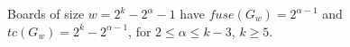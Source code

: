 \documentclass[12pt,letterpaper]{article}
\begin{document}
\begin{comment}
\begin{prop}
  Boards of size $w=2^n-5$ have $tc(G_w)=2^n-2$ and $fuse(G_w)=2$.
\end{prop}
\begin{proof} %
  Consider the board after $2^{n-2}$ steps, by~\cref{Power2} we have that $G_w(2^{n-2})=2^{n-2}-3\cdot 0\oplus 1\oplus 2^{n-1}-1\cdot 0 \oplus 1\oplus 2^{n-2}-3\cdot 0$. By the same proposition and~\cref{lightspeed}, it will advance through the next $2^{n-2}-3$ steps without interacting with the edges. By the same logic as used in the proof of~\cref{Power2}, we conclude that $G_w(2^{n-1}-4) = 0\oplus 1\oplus 7\cdot 0\oplus 1\oplus 7 \cdot 0\oplus\cdots\oplus 1\oplus 7\cdot 0\oplus 1\oplus 0$, with enough repetitions to fill the board, that is, $((2^n-5)-3)/8 = (2^n-8)/8=2^{n-3}-1$ repetitions. Then in two steps we get $000\oplus 1\oplus 000\oplus 1\oplus\cdots\oplus 000\oplus 1\oplus 000$, with $2^{n-2}-2$ 1s. And finally in two more steps this becomes $01\oplus 2^n-9\cdot 0 \oplus 10=G_w(2^{n-1})$. By~\cref{SymmetricAntipodeAll} we get the desired result. 
\end{proof}
\end{comment}
\begin{prop}\label{Pow2MinusPow2}
  Boards of size $w=2^k-2^\alpha-1$ have $fuse(G_w)=2^{\alpha-1}$ and $tc(G_w)=2^k-2^{\alpha-1}$, for $2 \leq \alpha \leq k-3$, $k\geq 5$. 
\end{prop}
\end{document}
